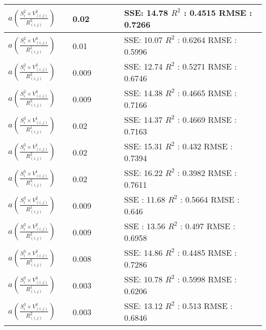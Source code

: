 \documentclass[10pt]{article}
\begin{document}
\begin{center}
\begin{table}[htbp]
\begin{center}
\begin{adjustbox}{width=0.5\textwidth}
\begin{tabular}{|p{0.25\linewidth}|p{0.2\linewidth}|p{0.55\linewidth}|}
\hline
$a(  \frac{S_{i}^2 \times V_{(i,j)}^2}{R_{(i,j)}^3})$ & 0.02 & SSE: 14.78  $R^2$ : 0.4515  RMSE : 0.7266 \\
\hline
 $a(  \frac{S_{i}^2 \times V_{(i,j)}^3}{R_{(i,j)}^1})$ &  0.01 &  SSE: 10.07  $R^2$ : 0.6264  RMSE : 0.5996 \\
\hline
 $a(  \frac{S_{i}^2 \times V_{(i,j)}^3}{R_{(i,j)}^2})$ & 0.009 & SSE: 12.74  $R^2$ : 0.5271  RMSE : 0.6746 \\
\hline
 $a(  \frac{S_{i}^2 \times V_{(i,j)}^3}{R_{(i,j)}^3})$ & 0.009 & SSE: 14.38  $R^2$ : 0.4665  RMSE : 0.7166\\
\hline
 $a(  \frac{S_{i}^3 \times V_{(i,j)}^1}{R_{(i,j)}^1})$ & 0.02 & SSE: 14.37  $R^2$ : 0.4669  RMSE : 0.7163 \\
\hline
 $a(  \frac{S_{i}^3 \times V_{(i,j)}^1}{R_{(i,j)}^2})$ & 0.02 & SSE: 15.31  $R^2$ : 0.432  RMSE : 0.7394 \\
\hline
 $a(  \frac{S_{i}^3 \times V_{(i,j)}^1}{R_{(i,j)}^3})$ & 0.02 & SSE: 16.22  $R^2$ : 0.3982  RMSE : 0.7611 \\
\hline
$a(  \frac{S_{i}^3 \times V_{(i,j)}^2}{R_{(i,j)}^1})$ & 0.009 & SSE : 11.68  $R^2$ : 0.5664  RMSE : 0.646 \\
\hline
$a(  \frac{S_{i}^3 \times V_{(i,j)}^2}{R_{(i,j)}^2})$ & 0.009 & SSE : 13.56  $R^2$ : 0.497  RMSE : 0.6958\\
\hline
 $a(  \frac{S_{i}^3 \times V_{(i,j)}^2}{R_{(i,j)}^3})$ & 0.008 & SSE: 14.86 $R^2$ : 0.4485  RMSE : 0.7286 \\
\hline
 $a(  \frac{S_{i}^3 \times V_{(i,j)}^3}{R_{(i,j)}^1})$ & 0.003 & SSE: 10.78  $R^2$ : 0.5998  RMSE : 0.6206 \\
\hline
$a(  \frac{S_{i}^3 \times V_{(i,j)}^3}{R_{(i,j)}^2})$ & 0.003 & SSE: 13.12  $R^2$ : 0.513  RMSE : 0.6846 \\
\hline
\end{tabular}
\end{adjustbox}
\end{center}
\end{table}
\end{center} 
\end{document}
